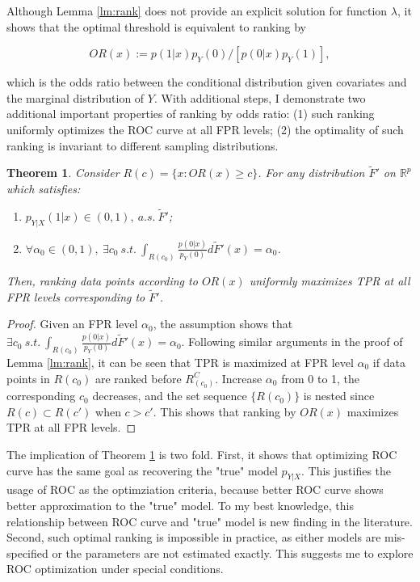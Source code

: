\documentclass{article} %
\newtheorem{theorem}{Theorem}
\begin{document}
Although Lemma \ref{lm:rank} does not provide an explicit solution for function $\lambda$, it shows that the optimal threshold is equivalent to ranking by 

\[
OR(x):=p(1|x)p_Y(0)/[p(0|x)p_Y(1)],
\]

which is the odds ratio between the conditional distribution given covariates and the marginal distribution of $Y$. With additional steps, I demonstrate two additional important properties of ranking by odds ratio: (1) such ranking uniformly optimizes the ROC curve at all FPR levels; (2) the optimality of such ranking is invariant to different sampling distributions.

\begin{theorem}\label{th:rank}
Consider $R(c)=\{x:OR(x)\geq c\}$. For any distribution $\tilde F'$ on $\mathbb R^p$ which satisfies: 
\begin{enumerate}
\item $p_{Y|X}(1|x)\in (0,1),~a.s. ~\tilde F'$;
\item $\forall \alpha_0\in (0,1),~\exists c_0~s.t.~\int_{R(c_0)}\frac{p(0|x)}{p_Y(0)}d\tilde F'(x)=\alpha_0$.
\end{enumerate}
Then, ranking data points according to $OR(x)$ uniformly maximizes TPR at all FPR levels corresponding to $\tilde F'$.
\end{theorem}

\begin{proof}
Given an FPR level $\alpha_0$, the assumption shows that $\exists c_0~s.t.~\int_{R(c_0)}\frac{p(0|x)}{p_Y(0)}d\tilde F'(x)=\alpha_0$. Following similar arguments in the proof of Lemma \ref{lm:rank}, it can be seen that TPR is maximized at FPR level $\alpha_0$ if data points in $R(c_0)$ are ranked before $R_(c_0)^C$. Increase $\alpha_0$ from 0 to 1, the corresponding $c_0$ decreases, and the set sequence $\{R(c_0)\}$ is nested since $R(c)\subset R(c')$ when $c>c'$. This shows that ranking by $OR(x)$ maximizes TPR at all FPR levels.
\end{proof}

The implication of Theorem \ref{th:rank} is two fold. First, it shows that optimizing ROC curve has the same goal as recovering the "true" model $p_{Y|X}$. This justifies the usage of ROC as the optimziation criteria, because better ROC curve shows better approximation to the "true" model. To my best knowledge, this relationship between ROC curve and "true" model is new finding in the literature. Second, such optimal ranking is impossible in practice, as either models are mis-specified or the parameters are not estimated exactly. This suggests me to explore ROC optimization under special conditions.
\end{document}
